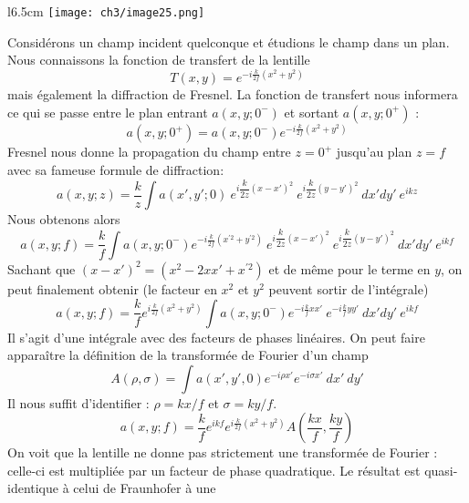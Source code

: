 	\begin{wrapfigure}[10]{l}{6.5cm}
	\vspace{-5mm}
	\texttt{[image: ch3/image25.png]}
	\end{wrapfigure}		
Considérons un champ incident quelconque et étudions le champ dans un plan. Nous connaissons 
la fonction de transfert de la lentille
\begin{equation}
T(x,y) = e^{-i\frac{k}{2f}(x^2+y^2)}
\end{equation}
mais également la diffraction de Fresnel. La fonction de transfert nous informera ce qui se passe 
entre le plan entrant $a(x,y;0^-)$ et sortant $a(x,y;0^+)$ :
\begin{equation}
a(x,y;0^+) = a(x,y;0^-)e^{-i\frac{k}{2f}(x^2+y^2)}
\end{equation}
Fresnel nous donne la propagation du champ entre $z=0^+$ jusqu'au plan $z=f$ avec sa fameuse formule 
de diffraction:
\begin{equation}
a(x,y;z) = \frac{k}{z}\int a(x',y';0)\ e^{i\dfrac{k}{2z}(x-x')^2}\
 e^{i\dfrac{k}{2z}(y-y')^2}\ dx'dy'\  e^{ikz}
\end{equation}
Nous obtenons alors
\begin{equation}
a(x,y;f) = \dfrac{k}{f}\int a(x,y;0^-)e^{-i\frac{k}{2f}(x^{'2}+y^{'2})}\ e^{i\dfrac{k}{2z}(x-x')^2}\
 e^{i\dfrac{k}{2z}(y-y')^2}\ dx'dy'\  e^{ikf}
\end{equation}
Sachant que $(x-x')^2 = (x^2-2xx'+x^{'2})$ et de même pour le terme en $y$, on peut finalement 
obtenir (le facteur en $x^2$ et $y^2$ peuvent sortir de l'intégrale)
\begin{equation}
a(x,y;f) = \dfrac{k}{f}e^{i\frac{k}{2f}(x^2+y^2)}\int a(x,y;0^-)e^{-i\frac{k}{f}xx'}\ e^{-i\frac{k}{f}yy'}\  
dx'dy'\  e^{ikf}
\end{equation}
Il s'agit d'une intégrale avec des facteurs de phases linéaires. On peut faire apparaître la définition de 
la transformée de Fourier d'un champ
\begin{equation}
A(\rho, \sigma) = \int a(x',y',0)e^{-i\rho x'}e^{-i\sigma x'}\ dx'\ dy'
\end{equation}
Il nous suffit d'identifier : $\rho = kx/f$ et $\sigma = ky/f$.
\begin{equation}
a(x,y;f) = \dfrac{k}{f}e^{ikf} e^{i\frac{k}{2f}(x^2+y^2)}A\left(\frac{kx}{f},\frac{ky}{f}\right)  
\end{equation}
On voit que la lentille ne donne pas strictement une transformée de Fourier : celle-ci est multipliée 
par un facteur de phase quadratique.  Le résultat est quasi-identique à celui de Fraunhofer à une 
